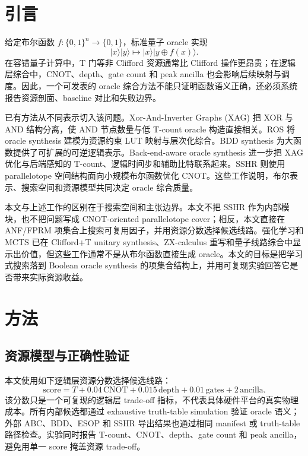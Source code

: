 \documentclass[UTF8,fontset=macnew,11pt]{ctexart}
\newcommand{\score}{\mathrm{score}}
\begin{document}
\section{引言}

给定布尔函数 $f:\{0,1\}^{n}\rightarrow\{0,1\}$，标准量子 oracle 实现
\begin{equation}
  |x\rangle|y\rangle \mapsto |x\rangle|y\oplus f(x)\rangle .
\end{equation}
在容错量子计算中，T 门等非 Clifford 资源通常比 Clifford 操作更昂贵；在逻辑层综合中，CNOT、depth、gate count 和 peak ancilla 也会影响后续映射与调度。因此，一个可发表的 oracle 综合方法不能只证明函数语义正确，还必须系统报告资源剖面、baseline 对比和失败边界。

已有方法从不同表示切入该问题。Xor-And-Inverter Graphs (XAG) 把 XOR 与 AND 结构分离，使 AND 节点数量与低 T-count oracle 构造直接相关\cite{meuli2022xag,meuli2019multiplicative}。ROS 将 oracle synthesis 建模为资源约束 LUT 映射与层次化综合\cite{meuli2020ros}。BDD synthesis 为大函数提供了可扩展的可逆逻辑表示\cite{wille2009bdd}。Back-end-aware oracle synthesis 进一步把 XAG 优化与后端感知的 T-count、逻辑时间步和辅助比特联系起来\cite{yu2025backend}。SSHR 则使用 parallelotope 空间结构面向小规模布尔函数优化 CNOT\cite{zheng2025sshr}。这些工作说明，布尔表示、搜索空间和资源模型共同决定 oracle 综合质量。

本文与上述工作的区别在于搜索空间和主张边界。本文不把 SSHR 作为内部模块，也不把问题写成 CNOT-oriented parallelotope cover；相反，本文直接在 ANF/FPRM 项集合上搜索可复用因子，并用资源分数选择候选线路。强化学习和 MCTS 已在 Clifford+T unitary synthesis、ZX-calculus 重写和量子线路综合中显示出价值\cite{rietsch2024unitary,riu2025zx,machiya2026monteq}，但这些工作通常不是从布尔函数直接生成 oracle。本文的目标是把学习式搜索落到 Boolean oracle synthesis 的项集合结构上，并用可复现实验回答它是否带来实际资源收益。

\section{方法}

\subsection{资源模型与正确性验证}

本文使用如下逻辑层资源分数选择候选线路：
\begin{equation}
  \score = T + 0.04\,\mathrm{CNOT} + 0.015\,\mathrm{depth}
         + 0.01\,\mathrm{gates} + 2\,\mathrm{ancilla}.
  \label{eq:score}
\end{equation}
该分数只是一个可复现的逻辑层 trade-off 指标，不代表具体硬件平台的真实物理成本。所有内部候选都通过 exhaustive truth-table simulation 验证 oracle 语义；外部 ABC、BDD、ESOP 和 SSHR 导出结果也通过相同 manifest 或 truth-table 路径检查。实验同时报告 T-count、CNOT、depth、gate count 和 peak ancilla，避免用单一 score 掩盖资源 trade-off。
\end{document}
